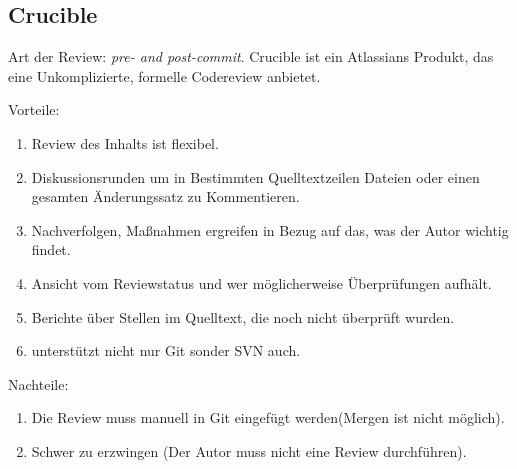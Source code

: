 \subsection{Crucible}
\label{subsec:Crucible}
Art der Review: \textit{pre- and post-commit}. Crucible ist ein Atlassians Produkt, das eine Unkomplizierte, formelle Codereview anbietet.

\begin{description}
	\item{Vorteile:}
	\begin{enumerate}
		\item Review des Inhalts ist flexibel.
		\item Diskussionsrunden um in Bestimmten Quelltextzeilen Dateien oder einen gesamten Änderungssatz zu Kommentieren.
		\item Nachverfolgen, Maßnahmen ergreifen in Bezug auf das, was der Autor wichtig findet.
		\item Ansicht vom Reviewstatus und wer möglicherweise Überprüfungen aufhält.
		\item Berichte über Stellen im Quelltext, die noch nicht überprüft wurden.
		\item unterstützt nicht nur Git sonder SVN auch.
	\end{enumerate}
	
	\item{Nachteile:}
	\begin{enumerate}
		\item Die Review muss manuell in Git eingefügt werden(Mergen ist nicht möglich).
		\item Schwer zu erzwingen (Der Autor muss nicht eine Review durchführen).
	\end{enumerate}
\end{description}
